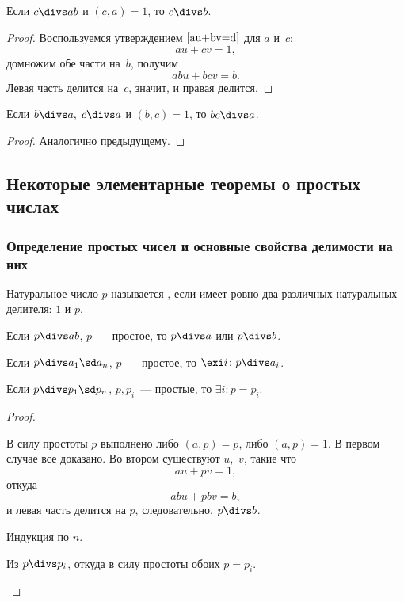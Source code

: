 \begin{imp}
  Если $c\divs ab$ и $(c,a)=1$, то $c\divs b$.
\end{imp}
\begin{proof}
  Воспользуемся утверждением $\ref{au+bv=d}$ для $a$ и~$c$:
  $$
    au+cv=1,
  $$
  домножим обе части на~$b$, получим
  $$
    abu + bcv = b.
  $$
  Левая часть делится на~$c$, значит, и правая делится.
\end{proof}

\begin{imp}
  Если $b\divs a,\;c\divs a$ и $(b,c)=1$, то $bc\divs a$.
\end{imp}
\begin{proof}
  Аналогично предыдущему.
\end{proof}

\subsection{Некоторые элементарные теоремы о простых числах}
\subsubsection{Определение простых чисел и основные свойства делимости на них}       

\begin{df}
  Натуральное число $p$ называется , если имеет 
	ровно два различных натуральных делителя: $1$ и $p$.
\end{df}

\begin{imp}
  \label{prime divs product}
  \begin{points}{0}
    \item Если $p\divs ab$, $p$~--- простое, то $p\divs a$ или $p\divs b$.
    \item Если $p\divs a_1\sd a_n$, $p$~--- простое, то $\exi i\colon p\divs a_i$.
    \item Если $p\divs p_1\sd p_n$, $p,p_i$~--- простые, то $\exi i\colon p=p_i$.
  \end{points}
\end{imp}
\begin{proof}
  \begin{points}{0}
    \item В силу простоты $p$ выполнено либо $(a,p)=p$, либо $(a,p)=1$. В первом случае все доказано. Во втором существуют $u$,~$v$, такие что
    $$
      au + pv = 1,
    $$
    откуда
    $$
      abu + pbv = b,
    $$
    и левая часть делится на $p$, следовательно, $p\divs b$.

    \item Индукция по $n$.

    \item Из  $p\divs p_i$, откуда в силу простоты обоих $p = p_i$.
  \end{points}
\end{proof}

